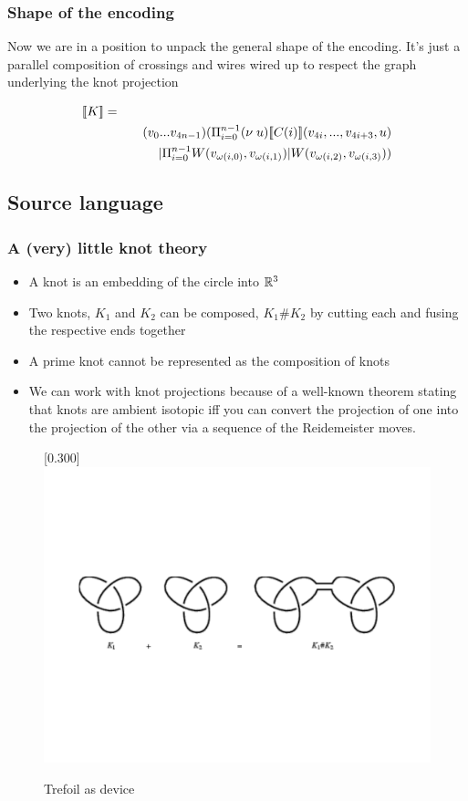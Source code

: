 \documentclass{beamer}
\begin{document}
\begin{frame}
  \frametitle{Shape of the encoding} 

  Now we are in a position to unpack the general shape of the
  encoding. It's just a parallel composition of crossings and wires
  wired up to respect the graph underlying the knot projection

  \begin{eqnarray}
    \lefteqn{\meaningof{K} =} \nonumber \\
    & & (v_0 ... v_{4n-1})( \Pi_{i = 0}^{n-1} (\nu \; u)\meaningof{C(i)}(v_{4i},...,v_{4i+3},u) \nonumber \\
    & & \; \; \; \; \; \; \; \; \; \; \; \; \; \; \; \; \; \; | \Pi_{i = 0}^{n-1} W(v_{\omega(i,0)},v_{\omega(i,1)})|W(v_{\omega(i,2)},v_{\omega(i,3)}) ) \nonumber
    \end{eqnarray}
\end{frame}

\subsection{Source language}
\begin{frame}
  \frametitle{A (very) little knot theory}    
  \begin{itemize}
    \item A knot is an embedding of the circle into $\mathbb{R}^3$
    \item Two knots, $K_1$ and $K_2$ can be composed, $K_1 \# K_2$ by
      cutting each and fusing the respective ends together
    \item A prime knot cannot be represented as the composition of knots
    \item We can work with knot projections because of a well-known
      theorem stating that knots are ambient isotopic iff you can
      convert the projection of one into the projection of the other
      via a sequence of the Reidemeister moves.
  \end{itemize}
  \begin{figure}[tbp]
    \centering
    \scalebox{0.30}[0.300]{\includegraphics[viewport=30 30 810 350]{KnotSum}}
    \caption{ Trefoil as device }
  \end{figure}
\end{frame}
\end{document}
